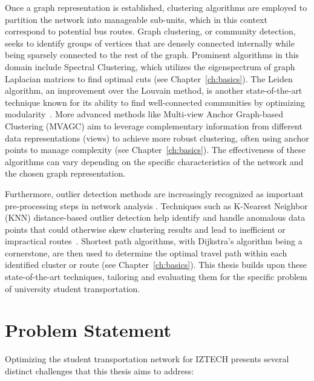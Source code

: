 Once a graph representation is established, clustering algorithms are employed to partition the network into manageable sub-units, which in this context correspond to potential bus routes. Graph clustering, or community detection, seeks to identify groups of vertices that are densely connected internally while being sparsely connected to the rest of the graph. Prominent algorithms in this domain include Spectral Clustering, which utilizes the eigenspectrum of graph Laplacian matrices to find optimal cuts (see Chapter~\ref{ch:basics}). The Leiden algorithm, an improvement over the Louvain method, is another state-of-the-art technique known for its ability to find well-connected communities by optimizing modularity~\cite{leiden}. More advanced methods like Multi-view Anchor Graph-based Clustering (MVAGC) aim to leverage complementary information from different data representations (views) to achieve more robust clustering, often using anchor points to manage complexity (see Chapter~\ref{ch:basics}). The effectiveness of these algorithms can vary depending on the specific characteristics of the network and the chosen graph representation.

Furthermore, outlier detection methods are increasingly recognized as important pre-processing steps in network analysis \cite{lu2020outlier}. Techniques such as K-Nearest Neighbor (KNN) distance-based outlier detection help identify and handle anomalous data points that could otherwise skew clustering results and lead to inefficient or impractical routes~\cite{knn_outlier}. Shortest path algorithms, with Dijkstra's algorithm being a cornerstone, are then used to determine the optimal travel path within each identified cluster or route (see Chapter~\ref{ch:basics}). This thesis builds upon these state-of-the-art techniques, tailoring and evaluating them for the specific problem of university student transportation.

\section{Problem Statement}
\label{sec:intro_problems}
Optimizing the student transportation network for IZTECH presents several distinct challenges that this thesis aims to address:

